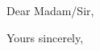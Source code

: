 \documentclass{uuletter2}
\date{}
\begin{document}
\opening{Dear Madam/Sir,}

\lipsum

\closing[prof. dr. A.B.C. Zonnebloem]{Yours sincerely,}
\end{document}
